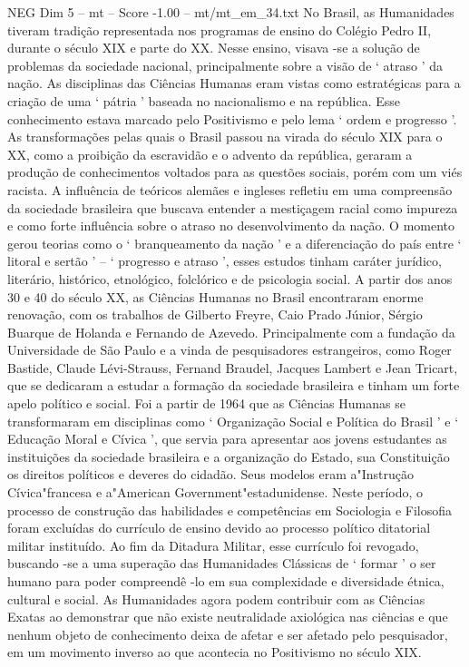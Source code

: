 \begin{textsample}{NEG Dim 5 – mt – Score -1.00 – mt/mt\_em\_34.txt}
No Brasil, as Humanidades tiveram tradição representada nos programas de ensino do Colégio Pedro II, durante o século XIX e parte do XX.
Nesse ensino, visava -se a solução de problemas da sociedade nacional, principalmente sobre a visão de ‘ atraso ’ da nação.
As disciplinas das Ciências Humanas eram vistas como estratégicas para a criação de uma ‘ pátria ’ baseada no nacionalismo e na república.
Esse conhecimento estava marcado pelo Positivismo e pelo lema ‘ ordem e progresso ’.
As transformações pelas quais o Brasil passou na virada do século XIX para o XX, como a proibição da escravidão e o advento da república, geraram a produção de conhecimentos voltados para as questões sociais, porém com um viés racista.
A influência de teóricos alemães e ingleses refletiu em uma compreensão da sociedade brasileira que buscava entender a mestiçagem racial como impureza e como forte influência sobre o atraso no desenvolvimento da nação.
O momento gerou teorias como o ‘ branqueamento da nação ’ e a diferenciação do país entre ‘ litoral e sertão ’ – ‘ progresso e atraso ’, esses estudos tinham caráter jurídico, literário, histórico, etnológico, folclórico e de psicologia social.
A partir dos anos 30 e 40 do século XX, as Ciências Humanas no Brasil encontraram enorme renovação, com os trabalhos de Gilberto Freyre, Caio Prado Júnior, Sérgio Buarque de Holanda e Fernando de Azevedo.
Principalmente com a fundação da Universidade de São Paulo e a vinda de pesquisadores estrangeiros, como Roger Bastide, Claude Lévi-Strauss, Fernand Braudel, Jacques Lambert e Jean Tricart, que se dedicaram a estudar a formação da sociedade brasileira e tinham um forte apelo político e social.
Foi a partir de 1964 que as Ciências Humanas se transformaram em disciplinas como ‘ Organização Social e Política do Brasil ’ e ‘ Educação Moral e Cívica ’, que servia para apresentar aos jovens estudantes as instituições da sociedade brasileira e a organização do Estado, sua Constituição os direitos políticos e deveres do cidadão.
Seus modelos eram a"Instrução Cívica"francesa e a"American Government"estadunidense.
Neste período, o processo de construção das habilidades e competências em Sociologia e Filosofia foram excluídas do currículo de ensino devido ao processo político ditatorial militar instituído.
Ao fim da Ditadura Militar, esse currículo foi revogado, buscando -se a uma superação das Humanidades Clássicas de ‘ formar ’ o ser humano para poder compreendê -lo em sua complexidade e diversidade étnica, cultural e social.
As Humanidades agora podem contribuir com as Ciências Exatas ao demonstrar que não existe neutralidade axiológica nas ciências e que nenhum objeto de conhecimento deixa de afetar e ser afetado pelo pesquisador, em um movimento inverso ao que acontecia no Positivismo no século XIX.

\end{textsample}
